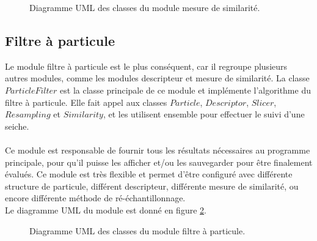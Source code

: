\begin{figure}[!htbp]
\center
\caption{Diagramme UML des classes du module mesure de similarité.}
\label{fig:uml_diagram_similarity}
\end{figure}
\FloatBarrier




\subsection{Filtre à particule}
Le module filtre à particule est le plus conséquent, car il regroupe plusieurs autres modules, comme les modules descripteur et mesure de similarité. La classe $ParticleFilter$ est la classe principale de ce module et implémente l'algorithme du filtre à particule. Elle fait appel aux classes $Particle$, $Descriptor$, $Slicer$, $Resampling$ et $Similarity$, et les utilisent ensemble pour effectuer le suivi d'une seiche.\\
\\
Ce module est responsable de fournir tous les résultats nécessaires au programme principale, pour qu'il puisse les afficher et/ou les sauvegarder pour être finalement évalués. Ce module est très flexible et permet d'être configuré avec différente structure de particule, différent descripteur, différente mesure de similarité, ou encore différente méthode de ré-échantillonnage.\\
Le diagramme UML du module est donné en figure \ref{fig:uml_diagram_particlefilter}.

\begin{figure}[!htbp]
\center
\caption{Diagramme UML des classes du module filtre à particule.}
\label{fig:uml_diagram_particlefilter}
\end{figure}
\FloatBarrier





